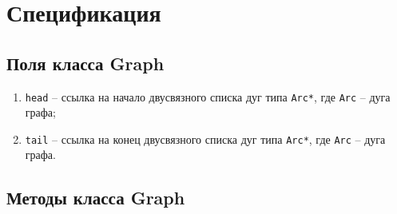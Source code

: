 \section{Спецификация}


\subsection{Поля класса Graph}


\begin{enumerate}
    \item \texttt{head} -- ссылка на начало двусвязного списка дуг типа \texttt{Arc*}, где \texttt{Arc} -- дуга графа;
    \item \texttt{tail} -- ссылка на конец двусвязного списка дуг типа \texttt{Arc*}, где \texttt{Arc} -- дуга графа.
\end{enumerate}


\subsection{Методы класса Graph}



